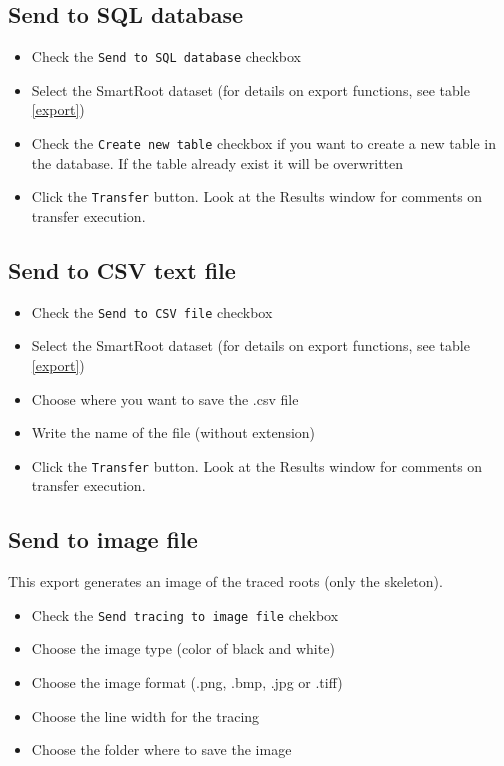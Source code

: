 \documentclass[a4paper,english,10pt]{report}
\begin{document}
\subsection{Send to SQL database\\}

\begin{itemize}
\item Check the \verb|Send to SQL database| checkbox 
\item Select the SmartRoot dataset (for details on export functions, see table \ref{export})
\item Check the \verb|Create new table| checkbox if you want to create a new table in the database. If the table already exist it will be overwritten
\item Click the \verb|Transfer| button. Look at the Results window for comments on transfer execution.\\
\end{itemize}

\subsection{Send to CSV text file\\}

\begin{itemize}
\item Check the \verb|Send to CSV file| checkbox 
\item Select the SmartRoot dataset (for details on export functions, see table \ref{export})
\item Choose where you want to save the .csv file
\item Write the name of the file (without extension)
\item Click the \verb|Transfer| button. Look at the Results window for comments on transfer execution.\\
\end{itemize}

\subsection{Send to image file}

This export generates an image of the traced roots (only the skeleton).

\begin{itemize}
\item Check the \verb|Send tracing to image file| chekbox
\item Choose the image type (color of black and white)
\item Choose the image format (.png, .bmp, .jpg or .tiff)
\item Choose the line width for the tracing
\item Choose the folder where to save the image
\end{itemize}
\end{document}
